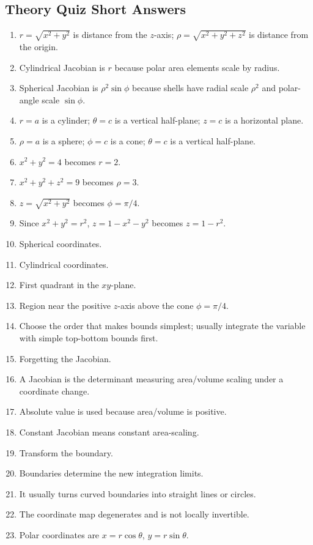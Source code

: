 \documentclass[11pt]{article}
\begin{document}
\subsection*{Theory Quiz Short Answers}
\begin{enumerate}
\item $r=\sqrt{x^2+y^2}$ is distance from the $z$-axis; $\rho=\sqrt{x^2+y^2+z^2}$ is distance from the origin.
\item Cylindrical Jacobian is $r$ because polar area elements scale by radius.
\item Spherical Jacobian is $\rho^2\sin\phi$ because shells have radial scale $\rho^2$ and polar-angle scale $\sin\phi$.
\item $r=a$ is a cylinder; $\theta=c$ is a vertical half-plane; $z=c$ is a horizontal plane.
\item $\rho=a$ is a sphere; $\phi=c$ is a cone; $\theta=c$ is a vertical half-plane.
\item $x^2+y^2=4$ becomes $r=2$.
\item $x^2+y^2+z^2=9$ becomes $\rho=3$.
\item $z=\sqrt{x^2+y^2}$ becomes $\phi=\pi/4$.
\item Since $x^2+y^2=r^2$, $z=1-x^2-y^2$ becomes $z=1-r^2$.
\item Spherical coordinates.
\item Cylindrical coordinates.
\item First quadrant in the $xy$-plane.
\item Region near the positive $z$-axis above the cone $\phi=\pi/4$.
\item Choose the order that makes bounds simplest; usually integrate the variable with simple top-bottom bounds first.
\item Forgetting the Jacobian.
\item A Jacobian is the determinant measuring area/volume scaling under a coordinate change.
\item Absolute value is used because area/volume is positive.
\item Constant Jacobian means constant area-scaling.
\item Transform the boundary.
\item Boundaries determine the new integration limits.
\item It usually turns curved boundaries into straight lines or circles.
\item The coordinate map degenerates and is not locally invertible.
\item Polar coordinates are $x=r\cos\theta$, $y=r\sin\theta$.

\end{enumerate}
\end{document}
